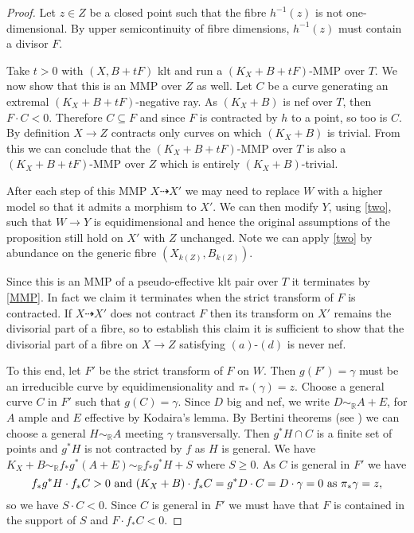 	\begin{proof}
		Let $z \in Z$ be a closed point such that the fibre $h^{-1}(z)$ is not one-dimensional. By upper semicontinuity of fibre dimensions, $h^{-1}(z)$ must contain a divisor $F$.
		
		Take $t >0$ with $(X,B+tF)$ klt and run a $(K_X+B+tF)$-MMP over $T$. 
		We now show that this is an MMP over $Z$ as well.	
		Let $C$ be a curve generating an extremal $(K_X+B+tF)$-negative ray. As $(K_{X}+B)$ is nef over $T$, then $F\cdot C <0$. Therefore $C \subseteq F$ and since $F$ is contracted by $h$ to a point, so too is $C$. By definition $X \to Z$ contracts only curves on which $(K_{X}+B)$ is trivial. From this we can conclude that the $(K_X+B+tF)$-MMP over $T$ is also a $(K_X+B+tF)$-MMP over $Z$ which is entirely $(K_{X}+B)$-trivial.  
		
		After each step of this MMP $X \dashrightarrow X'$ we may need to replace $W$ with a higher model so that it admits a morphism to $X'$. We can then modify $Y$, using \autoref{two}, such that $W \to Y$ is equidimensional and hence the original assumptions of the proposition still hold on $X'$ with $Z$ unchanged. Note we can apply \autoref{two} by abundance on the generic fibre $(X_{k(Z)},B_{k(Z)})$.
		
		Since this is an MMP of a pseudo-effective klt pair over $T$ it terminates by \autoref{MMP}. In fact we claim it terminates when the strict transform of $F$ is contracted. If $X\dashrightarrow X'$ does not contract $F$ then its transform on $X'$ remains the divisorial part of a fibre, so to establish this claim it is sufficient to show that the divisorial part of a fibre on $X \to Z$ satisfying $(a)$-$(d)$ is never nef. 
		
		To this end, let $F'$ be the strict transform of $F$ on $W$. Then $g(F')=\gamma$ must be an irreducible curve by equidimensionality and $\pi_*(\gamma)=z$. Choose a general curve $C$ in $F'$ such that $g(C)=\gamma$.
		Since $D$ big and nef, we write $D\sim_{\mathbb{R}} A+E$, for $A$ ample and $E$ effective by Kodaira's lemma.
		By Bertini theorems (see \cite[Theorem 2.15]{bhatt2020}) we can choose a general $H \sim_{\mathbb{R}} A$ meeting $\gamma$ transversally. 
		Then $g^{*}H \cap C$ is a finite set of points and $g^{*}H$ is not contracted by $f$ as $H$ is general.
		We have $K_{X}+B \sim_{\mathbb{R}}f_{*}g^{*}(A+E) \sim_{\mathbb{R}}f_{*}g^{*}H+S$ where $S \geq 0$. As $C$ is general in $F'$ we have
		$$f_{*}g^{*}H \cdot f_{*}C >0 \textup{ and } (K_{X}+B)\cdot f_{*}C=g^{*}D \cdot C=D \cdot \gamma=0 \text{ as } \pi_*\gamma=z,$$ so we have $S \cdot C <0$. Since $C$ is general in $F'$ we must have that $F$ is contained in the support of $S$ and $F \cdot f_{*}C <0$.
		

\end{proof}
